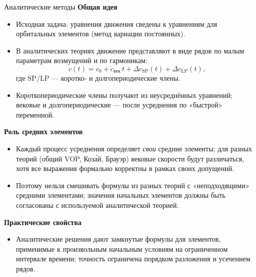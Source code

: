 \documentclass[8pt]{beamer}
\begin{document}
\begin{frame}{Аналитические методы}
\textbf{Общая идея}
\begin{itemize}
\justifying
  \item Исходная задача: уравнения движения сведены к уравнениям для орбитальных
        элементов (метод вариации постоянных).
  \item В аналитических теориях движение представляют в виде рядов по малым
        параметрам возмущений и по гармоникам:
        \[
          c(t) = c_0
                 + \dot c_{\text{век}}\,t
                 + \Delta c_{\text{SP}}(t)
                 + \Delta c_{\text{LP}}(t),
        \]
        где SP/LP — коротко- и долгопериодические члены. 
  \item Короткопериодические члены получают из неусреднённых уравнений; вековые и
        долгопериодические — после усреднения по «быстрой» переменной.
\end{itemize}

\vspace{0.4em}
\textbf{Роль средних элементов}

\begin{itemize}
\justifying
  \item Каждый процесс усреднения определяет \emph{свои} средние элементы; для разных
        теорий (общий VOP, Коза́й, Брауэр) вековые скорости будут различаться, хотя
        все выражения формально корректны в рамках своих допущений. 
  \item Поэтому нельзя смешивать формулы из разных теорий с «неподходящими»
        средними элементами; значения начальных элементов должны быть согласованы
        с используемой аналитической теорией.
\end{itemize}

\vspace{0.4em}
\textbf{Практические свойства}

\begin{itemize}
\justifying
  \item Аналитические решения дают замкнутые формулы для элементов,
        применимые к произвольным начальным условиям на ограниченном интервале
        времени; точность ограничена порядком разложения и усечением рядов.
\end{itemize}

\end{frame}
\end{document}
